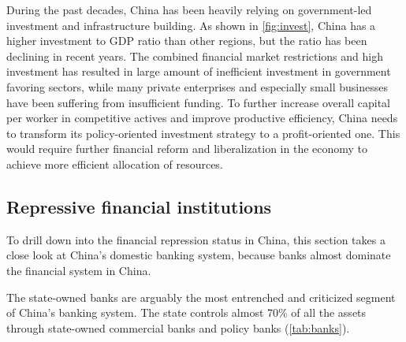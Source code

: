 \documentclass[AER]{AEA}
\begin{document}
During the past decades, China has been heavily relying on government-led
investment and infrastructure building. 
As shown in \autoref{fig:invest}, China has a higher investment to GDP ratio 
than other regions, but the ratio has been declining in recent years. 
The combined financial market restrictions and high investment has resulted in 
large amount of inefficient investment in government favoring sectors, 
while many private enterprises and especially small businesses have been 
suffering from insufficient funding. 
To further increase overall capital per worker in competitive actives 
and improve productive efficiency, 
China needs to transform its policy-oriented investment 
strategy to a profit-oriented one. 
This would require further financial reform 
and liberalization in the economy to achieve more efficient allocation of 
resources. \\

\subsection{Repressive financial institutions}

To drill down into the financial repression status in China, this section takes 
a close look at China's domestic banking system, because banks almost dominate 
the financial system in China.

The state-owned banks are arguably the most entrenched and criticized 
segment of China's banking system. The state controls almost 70\% of 
all the assets through state-owned commercial banks and policy banks 
(\autoref{tab:banks}).

%
\end{document}
